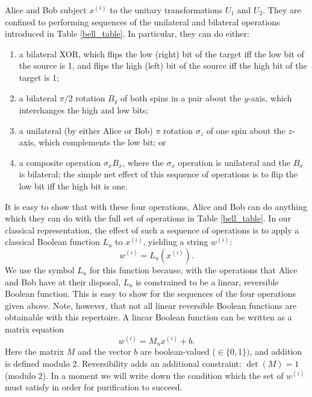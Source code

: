 Alice and Bob subject $x^{(i)}$ to the unitary transformations $U_1$
and $U_2$.  They are confined to performing sequences of the
unilateral and bilateral operations introduced in Table
\ref{bell_table}.  In particular, they can do either:
\begin{enumerate}
\item a bilateral XOR, which flips the
low (right) bit of the target iff the low bit of the source is 1, and
flips the high (left) bit of the source iff the high bit of the target
is 1;
\item a bilateral $\pi/2$ rotation $B_y$ of both spins in a pair
about the $y$-axis, which interchanges the high and low bits;
\item a unilateral (by either Alice or Bob) $\pi$ rotation $\sigma_z$
of one spin about the $z$-axis, which complements the low bit; or
\item a composite operation $\sigma_x B_x$, where
the $\sigma_x$ operation is unilateral and the $B_x$ is bilateral; the
simple net effect of this sequence of operations is to flip the low bit
iff the high bit is one.
\end{enumerate}
It is easy to show that with these four operations, Alice and Bob can
do anything which they can do with the full set of operations in Table
\ref{bell_table}.  In our classical representation, the effect of such
a sequence of operations is to apply a classical Boolean function
$L_u$ to $x^{(i)}$, yielding a string $w^{(i)}$:
\begin{equation}
w^{(i)}=L_u(x^{(i)}).
\end{equation}
We use the symbol $L_u$ for this function because, with the operations
that Alice and Bob have at their disposal, $L_u$ is constrained to be
a linear, reversible Boolean function.  This is easy to show for the
sequences of the four operations given above.  Note, however, that
not all linear reversible Boolean functions are obtainable with
this repertoire.
A linear Boolean function\cite{Cop2} can be
written as a matrix equation
\begin{equation}
w^{(i)}=M_ux^{(i)}+b.\label{boolin}
\end{equation}
Here the matrix $M$ and the vector $b$ are boolean-valued ($\in\{0,1\})$,
and addition is defined modulo 2.  Reversibility adds an
additional constraint: $\det(M)=1$ (modulo 2).  In a moment we will
write down the condition which the set of $w^{(i)}$ must satisfy in
order for purification to succeed.
 
